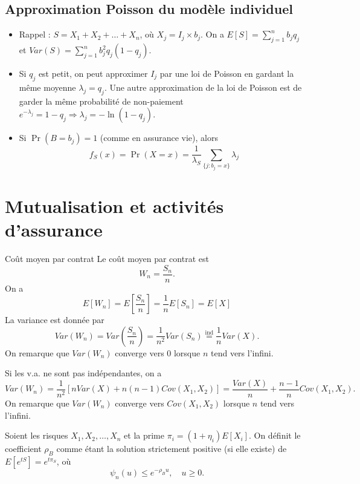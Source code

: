 \subsection{Approximation Poisson du modèle individuel}

\begin{itemize}
	\item Rappel : $S = X_1 + X_2 + \dots + X_n$, où $X_j = I_j \times b_j$. On a $E[S] = \sum_{j = 1}^{n}b_j q_j$ et $Var(S) = \sum_{j = 1}^{n}b_j^2 q_j(1-q_j)$.
	\item Si $q_j$ est petit, on peut approximer $I_j$ par une loi de Poisson en gardant la même moyenne $\lambda_j = q_j$. Une autre approximation de la loi de Poisson est de garder la même probabilité de non-paiement $e^{-\lambda_j} = 1 - q_j \Rightarrow \lambda_j = -\ln(1-q_j)$. 
	\item Si $\Pr(B = b_j) = 1$ (comme en assurance vie), alors 
	$$f_S(x) = \Pr(X = x) = \frac{1}{\lambda_S}\sum_{\{j: b_j = x\}} \lambda_j$$
	
\end{itemize}
\section{Mutualisation et activités d'assurance}

\begin{definition}{Coût moyen par contrat}{}
	Le coût moyen par contrat est 
	$$W_n = \frac{S_n}{n}.$$
	On a 
	$$E[W_n] = E\left[\frac{S_n}{n}\right] = \frac{1}{n}E[S_n] = E[X]$$
	La variance est donnée par 
	$$Var(W_n) = Var\left(\frac{S_n}{n}\right) = \frac{1}{n^2}Var(S_n) \stackrel{\text{ind}}{=} \frac{1}{n}Var(X).$$
	On remarque que $Var(W_n)$ converge vers 0 lorsque $n$ tend vers l'infini. 
\end{definition}

Si les v.a. ne sont pas indépendantes, on a 
$$Var(W_n) = \frac{1}{n^2}[nVar(X) + n(n-1) Cov(X_1, X_2)] = \frac{Var(X)}{n} + \frac{n-1}{n}Cov(X_1, X_2).$$
On remarque que $Var(W_n)$ converge vers $Cov(X_1, X_2)$ lorsque $n$ tend vers l'infini. 

\begin{proposition}{}{}
	Soient les risques $X_1, X_2, \dots, X_n$ et la prime $\pi_i = (1 + \eta_i)E[X_i]$. On définit le coefficient $\rho_B$ comme étant la solution strictement positive (si elle existe) de $E[e^{tS}] = e^{t\pi_S}$, où 
	$$\psi_n(u) \leq e^{-\rho_B u}, \quad u\geq 0.$$
\end{proposition}


